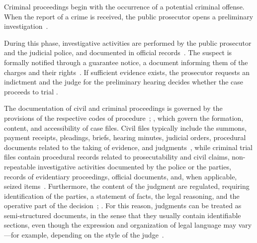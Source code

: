 
\medskip
\noindent
Criminal proceedings begin with the occurrence of a potential criminal offense. When the report of a crime is received, the public prosecutor opens a preliminary investigation~\cite[Art.~326]{CPP}.

During this phase, investigative activities are performed by the public prosecutor and the judicial police, and documented in official records~\cite[Art.~373]{CPP}. The suspect is formally notified through a guarantee notice, a document informing them of the charges and their rights~\cite[Art.~369]{CPP}. If sufficient evidence exists, the prosecutor requests an indictment and the judge for the preliminary hearing decides whether the case proceeds to trial \cite[Art.~416]{CPP}.



\medskip
\noindent
The documentation of civil and criminal proceedings is governed by the provisions of the respective codes of procedure~\cite[Art.~168--169]{CPC}; \cite[Art.~431, 114]{CPP}, which govern the formation, content, and accessibility of case files.
Civil files typically include the summons, payment receipts, pleadings, briefs, hearing minutes, judicial orders, procedural documents related to the taking of evidence, and judgments~\cite[Art.~168]{CPC}, while criminal trial files contain procedural records related to prosecutability and civil claims, non-repeatable investigative activities documented by the police or the parties, records of evidentiary proceedings, official documents, and, when applicable, seized items~\cite[Art.~431]{CPP}.
Furthermore, the content of the judgment are regulated, requiring identification of the parties, a statement of facts, the legal reasoning, and the operative part of the decision~\cite[Art.~546]{CPP}; \cite[Art.~132]{CPC}. For this reason, judgments can be treated as semi-structured documents, in the sense that they usually contain identifiable sections, even though the expression and organization of legal language may vary---for example, depending on the style of the judge~\cite{juliahb2024,galli2025analisi,pont2023legalsummarisationllmsprodigit}.



